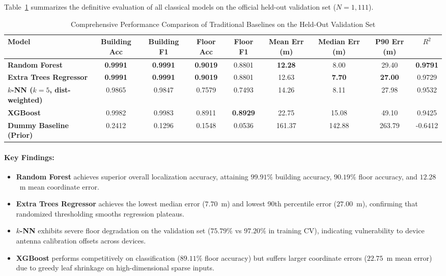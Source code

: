 Table~\ref{tab:master-comparison} summarizes the definitive evaluation of all classical models on the official held-out validation set ($N=1,111$).

\begin{table}[t]
\centering
\caption{Comprehensive Performance Comparison of Traditional Baselines on the Held-Out Validation Set}
\label{tab:master-comparison}
\begin{tabular}{lcccccccc}
\toprule
\textbf{Model} & \textbf{Building Acc} & \textbf{Building F1} & \textbf{Floor Acc} & \textbf{Floor F1} & \textbf{Mean Err (m)} & \textbf{Median Err (m)} & \textbf{P90 Err (m)} & \textbf{$R^2$} \\
\midrule
\textbf{Random Forest} & \textbf{0.9991} & \textbf{0.9991} & \textbf{0.9019} & 0.8801 & \textbf{12.28} & 8.00 & 29.40 & \textbf{0.9791} \\
\textbf{Extra Trees Regressor} & \textbf{0.9991} & \textbf{0.9991} & \textbf{0.9019} & 0.8801 & 12.63 & \textbf{7.70} & \textbf{27.00} & 0.9729 \\
\textbf{$k$-NN ($k=5$, dist-weighted)} & 0.9865 & 0.9847 & 0.7579 & 0.7493 & 14.26 & 8.11 & 27.98 & 0.9532 \\
\textbf{XGBoost} & 0.9982 & 0.9983 & 0.8911 & \textbf{0.8929} & 22.75 & 15.08 & 49.10 & 0.9425 \\
\textbf{Dummy Baseline (Prior)} & 0.2412 & 0.1296 & 0.1548 & 0.0536 & 161.37 & 142.88 & 263.79 & -0.6412 \\
\bottomrule
\end{tabular}
\end{table}

\paragraph{Key Findings:}
\begin{itemize}
  \item \textbf{Random Forest} achieves superior overall localization accuracy, attaining $99.91\%$ building accuracy, $90.19\%$ floor accuracy, and $12.28$~m mean coordinate error.
  \item \textbf{Extra Trees Regressor} achieves the lowest median error ($7.70$~m) and lowest 90th percentile error ($27.00$~m), confirming that randomized thresholding smooths regression plateaus.
  \item \textbf{$k$-NN} exhibits severe floor degradation on the validation set ($75.79\%$ vs $97.20\%$ in training CV), indicating vulnerability to device antenna calibration offsets across devices.
  \item \textbf{XGBoost} performs competitively on classification ($89.11\%$ floor accuracy) but suffers larger coordinate errors ($22.75$~m mean error) due to greedy leaf shrinkage on high-dimensional sparse inputs.
\end{itemize}

